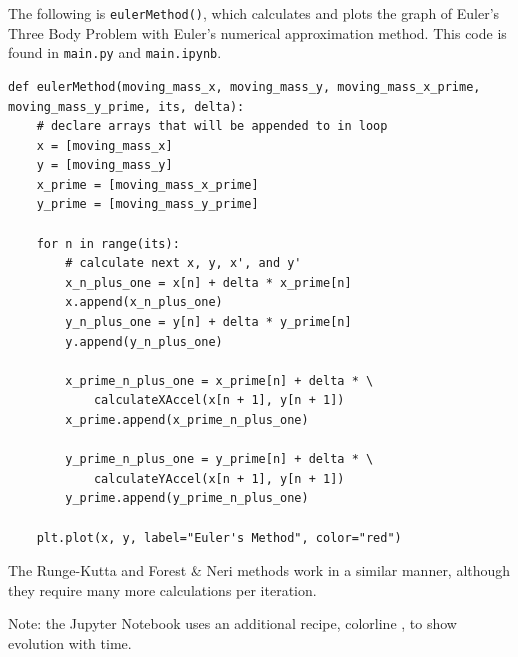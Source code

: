 \documentclass[preprint,titlepage,preprintnumbers,amsmath,amssymb,aps,11pt]{revtex4-2}
\begin{document}
The following is \texttt{eulerMethod()}, which calculates and plots the graph of Euler's Three Body Problem with Euler's numerical approximation method. This code is found in \texttt{main.py} and \texttt{main.ipynb}.

\begin{lstlisting}[style=mypython]
def eulerMethod(moving_mass_x, moving_mass_y, moving_mass_x_prime, moving_mass_y_prime, its, delta):
    # declare arrays that will be appended to in loop
    x = [moving_mass_x]
    y = [moving_mass_y]
    x_prime = [moving_mass_x_prime]
    y_prime = [moving_mass_y_prime]

    for n in range(its):
        # calculate next x, y, x', and y'
        x_n_plus_one = x[n] + delta * x_prime[n]
        x.append(x_n_plus_one)
        y_n_plus_one = y[n] + delta * y_prime[n]
        y.append(y_n_plus_one)

        x_prime_n_plus_one = x_prime[n] + delta * \
            calculateXAccel(x[n + 1], y[n + 1])
        x_prime.append(x_prime_n_plus_one)

        y_prime_n_plus_one = y_prime[n] + delta * \
            calculateYAccel(x[n + 1], y[n + 1])
        y_prime.append(y_prime_n_plus_one)

    plt.plot(x, y, label="Euler's Method", color="red")
\end{lstlisting}

The Runge-Kutta and Forest \& Neri methods work in a similar manner, although they require many more calculations per iteration.

Note: the Jupyter Notebook uses an additional recipe, colorline \cite{Colorline}, to show evolution with time.


\end{document}
